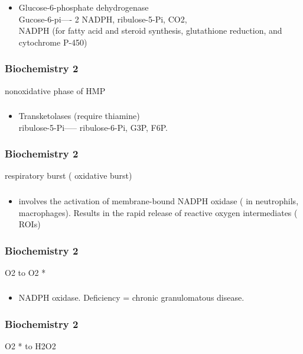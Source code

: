 \documentclass[11pt]{beamer}
\begin{document}
\begin{frame}
 \frametitle{}
\begin{itemize}
\item Glucose-6-phosphate dehydrogenase \\ Gucose-6-pi---- 2 NADPH, ribulose-5-Pi, CO2,  \\ NADPH (for fatty acid and steroid synthesis, glutathione reduction, and cytochrome P-450)
\end{itemize}
\end{frame}

\begin{frame}
 \frametitle{Biochemistry 2}
nonoxidative phase of HMP 
\end{frame}

\begin{frame}
 \frametitle{}
\begin{itemize}
\item Transketolases (require thiamine) \\ ribulose-5-Pi----- ribulose-6-Pi, G3P, F6P. 
\end{itemize}
\end{frame}

\begin{frame}
 \frametitle{Biochemistry 2}
respiratory burst ( oxidative burst)
\end{frame}

\begin{frame}
 \frametitle{}
\begin{itemize}
\item involves the activation of membrane-bound NADPH oxidase ( in neutrophils, macrophages). Results in the rapid release of reactive oxygen intermediates ( ROIs) 
\end{itemize}
\end{frame}

\begin{frame}
 \frametitle{Biochemistry 2}
O2 to O2 *
\end{frame}

\begin{frame}
 \frametitle{}
\begin{itemize}
\item NADPH oxidase. Deficiency = chronic granulomatous disease. 
\end{itemize}
\end{frame}

\begin{frame}
 \frametitle{Biochemistry 2}
O2 * to H2O2 
\end{frame}
\end{document}
